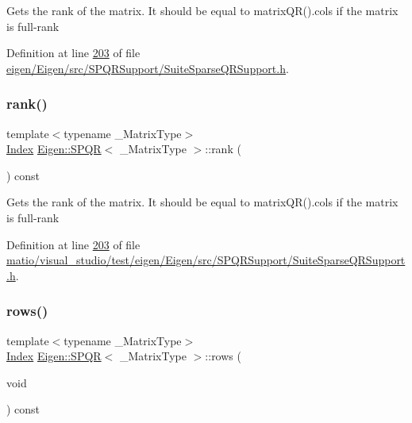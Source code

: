Gets the rank of the matrix. It should be equal to matrix\+Q\+R().cols if the matrix is full-\/rank 

Definition at line \hyperlink{eigen_2_eigen_2src_2_s_p_q_r_support_2_suite_sparse_q_r_support_8h_source_l00203}{203} of file \hyperlink{eigen_2_eigen_2src_2_s_p_q_r_support_2_suite_sparse_q_r_support_8h_source}{eigen/\+Eigen/src/\+S\+P\+Q\+R\+Support/\+Suite\+Sparse\+Q\+R\+Support.\+h}.

\mbox{\label{class_eigen_1_1_s_p_q_r_a539b394ddb4894089e6634c744ea2ddc}} 
\subsubsection{\texorpdfstring{rank()}{rank()}\hspace{0.1cm}{\footnotesize\ttfamily [2/2]}}
{\footnotesize\ttfamily template$<$typename \+\_\+\+Matrix\+Type$>$ \\
\hyperlink{namespace_eigen_a62e77e0933482dafde8fe197d9a2cfde}{Index} \hyperlink{class_eigen_1_1_s_p_q_r}{Eigen\+::\+S\+P\+QR}$<$ \+\_\+\+Matrix\+Type $>$\+::rank (\begin{DoxyParamCaption}{ }\end{DoxyParamCaption}) const\hspace{0.3cm}{\ttfamily [inline]}}

Gets the rank of the matrix. It should be equal to matrix\+Q\+R().cols if the matrix is full-\/rank 

Definition at line \hyperlink{matio_2visual__studio_2test_2eigen_2_eigen_2src_2_s_p_q_r_support_2_suite_sparse_q_r_support_8h_source_l00203}{203} of file \hyperlink{matio_2visual__studio_2test_2eigen_2_eigen_2src_2_s_p_q_r_support_2_suite_sparse_q_r_support_8h_source}{matio/visual\+\_\+studio/test/eigen/\+Eigen/src/\+S\+P\+Q\+R\+Support/\+Suite\+Sparse\+Q\+R\+Support.\+h}.

\mbox{\label{class_eigen_1_1_s_p_q_r_a775e28a44fd466638114edbcd17ea50a}} 
\subsubsection{\texorpdfstring{rows()}{rows()}\hspace{0.1cm}{\footnotesize\ttfamily [1/2]}}
{\footnotesize\ttfamily template$<$typename \+\_\+\+Matrix\+Type$>$ \\
\hyperlink{namespace_eigen_a62e77e0933482dafde8fe197d9a2cfde}{Index} \hyperlink{class_eigen_1_1_s_p_q_r}{Eigen\+::\+S\+P\+QR}$<$ \+\_\+\+Matrix\+Type $>$\+::rows (\begin{DoxyParamCaption}\item[{void}]{ }\end{DoxyParamCaption}) const\hspace{0.3cm}{\ttfamily [inline]}}

